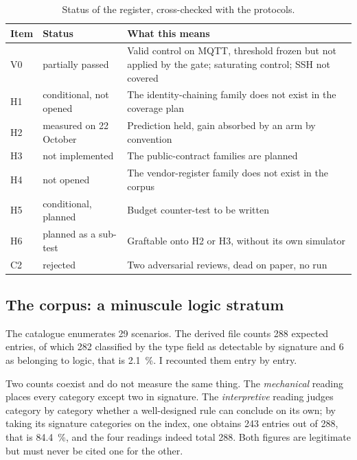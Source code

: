 \begin{table}[H]
\centering
\caption{Status of the register, cross-checked with the protocols.}
\label{tab:registre}
\small
\begin{tabular}{@{}p{1.1cm}p{3.4cm}p{8.2cm}@{}}
\toprule
Item & Status & What this means \\
\midrule
V0 & partially passed & Valid control on MQTT, threshold frozen but not applied by the gate; saturating control; SSH not covered \\
H1 & conditional, not opened & The identity-chaining family does not exist in the coverage plan \\
H2 & measured on 22 October & Prediction held, gain absorbed by an arm by convention \\
H3 & not implemented & The public-contract families are planned \\
H4 & not opened & The vendor-register family does not exist in the corpus \\
H5 & conditional, planned & Budget counter-test to be written \\
H6 & planned as a sub-test & Graftable onto H2 or H3, without its own simulator \\
C2 & rejected & Two adversarial reviews, dead on paper, no run \\
\bottomrule
\end{tabular}
\end{table}

\subsection{The corpus: a minuscule logic stratum}

The catalogue enumerates 29 scenarios. The derived file
 counts 288 expected entries, of which
282 classified by the type field as detectable by signature and 6 as belonging to
logic, that is 2.1~\%. I recounted them entry by entry.

Two counts coexist and do not measure the same thing. The \emph{mechanical}
reading places every category except two in signature. The \emph{interpretive}
reading judges category by category whether a well-designed rule can conclude on
its own; by taking its signature categories on the index, one obtains 243 entries
out of 288, that is 84.4~\%, and the four readings indeed total 288. Both figures
are legitimate but must never be cited one for the other.

